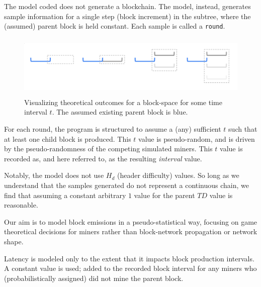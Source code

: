 \documentclass[11pt]{article}
\theoremstyle{plain}
\begin{document}
The model coded does not generate a blockchain. The model, instead,
generates sample information for a single step (block increment)
in the subtree, where the (assumed) parent block is held constant.
Each sample is called a \texttt{round}.

\begin{figure}[tph]
    \centering
    \includegraphics[height=3cm]{vis_theoretical_block-space.png}
    \caption{
        Visualizing theoretical outcomes for a block-space for some time interval
        $t$. The assumed existing parent block is blue.
    }
\end{figure}

For each round, the program is structured to assume a (any) sufficient $t$ such
that at least one child block is produced. This $t$ value is pseudo-random, and
is driven by the pseudo-randomness of the competing simulated miners.
This $t$ value is recorded as, and here referred to, as the resulting
\textit{interval} value.

Notably, the model does not use $H_d$ (header difficulty) values.
So long as we understand that the samples generated do not represent a continuous
chain, we find that assuming a constant arbitrary $1$ value for the
parent $TD$ value is reasonable.

Our aim is to model block emissions in a pseudo-statistical way,
focusing on game theoretical decisions for miners rather than
block-network propagation or network shape.

Latency is modeled only to the extent that it impacts block production
intervals. A constant value is used; added to the recorded block interval
for any miners who (probabilistically assigned) did not mine the
parent block.

%
%
\end{document}
